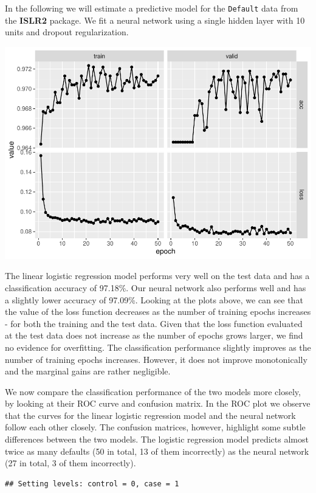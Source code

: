 \documentclass[
]{article}
\begin{document}
In the following we will estimate a predictive model for the
\texttt{Default} data from the \textbf{ISLR2} package. We fit a neural
network using a single hidden layer with 10 units and dropout
regularization.

\includegraphics{A4_files/figure-latex/unnamed-chunk-18-1.pdf}

The linear logistic regression model performs very well on the test data
and has a classification accuracy of 97.18\%. Our neural network also
performs well and has a slightly lower accuracy of 97.09\%. Looking at
the plots above, we can see that the value of the loss function
decreases as the number of training epochs increases - for both the
training and the test data. Given that the loss function evaluated at
the test data does not increase as the number of epochs grows larger, we
find no evidence for overfitting. The classification performance
slightly improves as the number of training epochs increases. However,
it does not improve monotonically and the marginal gains are rather
negligible.

We now compare the classification performance of the two models more
closely, by looking at their ROC curve and confusion matrix. In the ROC
plot we observe that the curves for the linear logistic regression model
and the neural network follow each other closely. The confusion
matrices, however, highlight some subtle differences between the two
models. The logistic regression model predicts almost twice as many
defaults (50 in total, 13 of them incorrectly) as the neural network (27
in total, 3 of them incorrectly).

\begin{verbatim}
## Setting levels: control = 0, case = 1
\end{verbatim}
\end{document}
